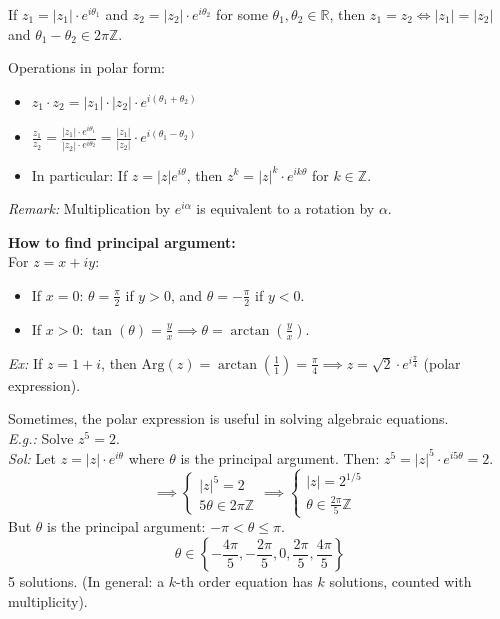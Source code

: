 If $z_{1} = |z_{1}| \cdot e^{i\theta_{1}}$ and $z_{2} = |z_{2}| \cdot e^{i\theta_{2}}$ for some $\theta_{1}, \theta_{2} \in \mathbb{R}$, then $z_{1} = z_{2} \iff |z_{1}| = |z_{2}|$ and $\theta_{1} - \theta_{2} \in 2\pi\mathbb{Z}$.

Operations in polar form:
\begin{itemize}
    \item $z_{1} \cdot z_{2} = |z_{1}| \cdot |z_{2}| \cdot e^{i(\theta_{1} + \theta_{2})}$
    \item $\displaystyle \frac{z_{1}}{z_{2}} = \frac{|z_{1}| \cdot e^{i\theta_{1}}}{|z_{2}| \cdot e^{i\theta_{2}}} = \frac{|z_{1}|}{|z_{2}|} \cdot e^{i(\theta_{1} - \theta_{2})}$
    \item In particular: If $z = |z|e^{i\theta}$, then $z^{k} = |z|^{k} \cdot e^{ik\theta}$ for $k \in \mathbb{Z}$.
\end{itemize}

\textit{Remark:} Multiplication by $e^{i\alpha}$ is equivalent to a rotation by $\alpha$.

\textbf{How to find principal argument:} \\
For $z = x + iy$:
\begin{itemize}
    \item If $x = 0$: $\theta = \frac{\pi}{2}$ if $y > 0$, and $\theta = -\frac{\pi}{2}$ if $y < 0$.
    \item If $x > 0$: $\tan(\theta) = \frac{y}{x} \implies \theta = \arctan\left(\frac{y}{x}\right)$.
\end{itemize}

\textit{Ex:} If $z = 1 + i$, then $\text{Arg}(z) = \arctan\left(\frac{1}{1}\right) = \frac{\pi}{4} \implies z = \sqrt{2} \cdot e^{i\frac{\pi}{4}}$ (polar expression).

\begin{example}
Sometimes, the polar expression is useful in solving algebraic equations. \\
\textit{E.g.:} Solve $z^{5} = 2$. \\
\textit{Sol:} Let $z = |z| \cdot e^{i\theta}$ where $\theta$ is the principal argument.
Then: $z^{5} = |z|^{5} \cdot e^{i5\theta} = 2$.
$$ \implies \begin{cases} |z|^{5} = 2 \\ 5\theta \in 2\pi\mathbb{Z} \end{cases} \implies \begin{cases} |z| = 2^{1/5} \\ \theta \in \frac{2\pi}{5}\mathbb{Z} \end{cases} $$
But $\theta$ is the principal argument: $-\pi < \theta \leq \pi$.
$$\theta \in \left\{ -\frac{4\pi}{5}, -\frac{2\pi}{5}, 0, \frac{2\pi}{5}, \frac{4\pi}{5} \right\}$$
5 solutions. (In general: a $k$-th order equation has $k$ solutions, counted with multiplicity).
\end{example}

